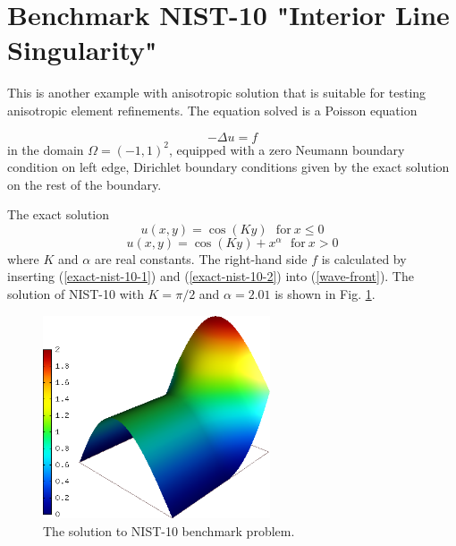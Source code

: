 \section{Benchmark NIST-10 "Interior Line Singularity"}
\label{sec:bench-10}

This is another example with anisotropic solution that is suitable for testing
anisotropic element refinements.
The equation solved is a Poisson equation

\begin{equation} \label{interior}
-\Delta u = f
\end{equation}
in the domain $\Omega = (-1, 1)^2$, equipped with a zero
Neumann boundary condition on left edge, Dirichlet boundary conditions given by the
exact solution on the rest of the boundary.

The exact solution
\begin{equation}\label{exact-nist-10-1}
u(x,y) = \cos(Ky)\ \ \ \mbox{for}\ x \le 0
\end{equation}
\begin{equation}\label{exact-nist-10-2}
u(x,y) = \cos(Ky) + x^{\alpha}\ \ \ \mbox{for}\ x > 0
\end{equation}
where $K$ and $\alpha$ are real constants.
The right-hand side $f$ is calculated by inserting
(\ref{exact-nist-10-1}) and (\ref{exact-nist-10-2}) into (\ref{wave-front}).
The solution of NIST-10 with $K = \pi/2$ and
$\alpha = 2.01$ is shown in Fig. \ref{fig:sln-nist10}.

\begin{figure}[!ht]
\centering
\includegraphics[height=6cm]{nist/nist-10/solution.png}
\caption{The solution to NIST-10 benchmark problem.}
\label{fig:sln-nist10}
\end{figure}
